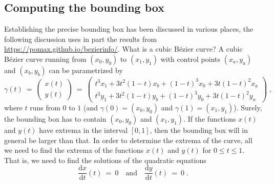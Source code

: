 \subsection{Computing the bounding box}

Establishing the precise bounding box has been discussed in various places, the
following discussion uses in part the results from
\url{https://pomax.github.io/bezierinfo/}. What is a cubic B\'ezier curve? A
cubic B\'ezier curve running from $(x_0,y_0)$ to $(x_1,y_1)$ with control points
$(x_a,y_a)$ and $(x_b,y_b)$ can be parametrized by
\begin{equation}
 \gamma(t)~=~
 \begin{pmatrix} x(t)\\ y(t) \end{pmatrix}~=~
 \begin{pmatrix}t^3 x_{1}+3 t^2 (1-t) x_{b}+(1-t)^3
   x_{0}+3 t (1-t)^2 x_{a}\\
   t^3 y_{1}+3
   t^2 (1-t) y_{b}+(1-t)^3 y_{0}+3 t (1-t)^2
   y_{a}\end{pmatrix}\;,\label{eq:gammaBezier}
\end{equation}
where $t$ runs from $0$ to $1$ (and $\gamma(0)=(x_0,y_0)$ and
$\gamma(1)=(x_1,y_1)$). Surely, the bounding box has to contain
$(x_0,y_0)$ and $(x_1,y_1)$. If the functions $x(t)$ and $y(t)$ have extrema in
the interval $[0,1]$, then the bounding box will in general be larger than that.
In order to determine the extrema of the curve, all
we need to find the extrema of the functions $x(t)$ and $y(t)$ for $0\le t\le
1$. That is, we need to find the solutions of the quadratic equations
\begin{equation}
 \frac{\mathrm{d}x}{\mathrm{d}t}(t)~=~0\quad\text{and}\quad
 \frac{\mathrm{d}y}{\mathrm{d}t}(t)~=~0\;.
\end{equation}
